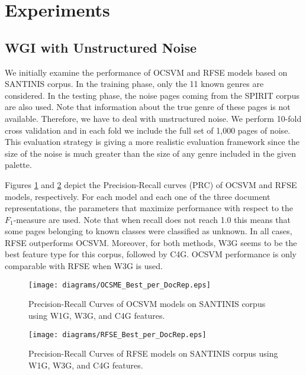 \documentclass[runningheads]{llncs}
\begin{document}
\section{Experiments}\label{sec:Experiments_Results}
\subsection{WGI with Unstructured Noise}\label{sec:WGI_noise}

We initially examine the performance of OCSVM and RFSE models based on SANTINIS corpus. In the training phase, only the 11 known genres are considered. In the testing phase, the noise pages coming from the SPIRIT corpus are also used. Note that information about the true genre of these pages is not available. Therefore, we have to deal with unstructured noise. We perform  10-fold cross validation and in each fold we include the full set of 1,000 pages of noise. This evaluation strategy is giving a more realistic evaluation framework since the size of the noise is much greater than the size of any genre included in the given palette.

Figures \ref{fig:MacroPRC_OCSVME_W3G_W1G_C4G_OPTIMAL_SANTINIS} and \ref{fig:MacroPRC_RFSE_W3G_W1G_C4G_OPTIMAL_SANTINIS} depict the Precision-Recall curves (PRC) of OCSVM and RFSE models, respectively. For each model and each one of the three document representations, the parameters that maximize performance with respect to the $F_{1}$-measure are used. Note that when recall does not reach 1.0 this means that some pages belonging to known classes were classified as unknown. In all cases, RFSE outperforms OCSVM. Moreover, for both methods, W3G seems to be the best feature type for this corpus, followed by C4G. OCSVM performance is only comparable with RFSE when W3G is used.

\hfill \break


\begin{figure}[H]
\begin{center}
    \texttt{[image: diagrams/OCSME\_Best\_per\_DocRep.eps]}
	\caption{Precision-Recall Curves of OCSVM models on SANTINIS corpus using W1G, W3G, and C4G features.}
	\label{fig:MacroPRC_OCSVME_W3G_W1G_C4G_OPTIMAL_SANTINIS}
	\end{center}
\end{figure}

\begin{figure}[H]
\begin{center}
    \texttt{[image: diagrams/RFSE\_Best\_per\_DocRep.eps]}
	\caption{Precision-Recall Curves of RFSE models on SANTINIS corpus using W1G, W3G, and C4G features.}
	\label{fig:MacroPRC_RFSE_W3G_W1G_C4G_OPTIMAL_SANTINIS}
	\end{center}
\end{figure}
\end{document}

